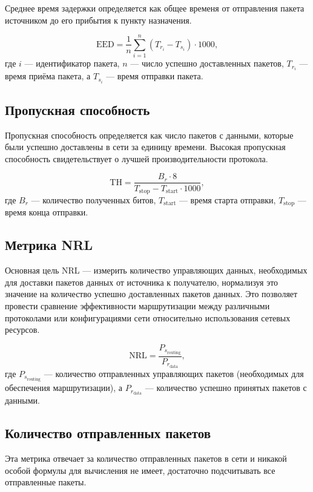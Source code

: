 Среднее время задержки определяется как общее временя от отправления пакета источником до его прибытия к пункту назначения.

\begin{equation}
  \label{eq:delay_calculation}
  \text{EED} = \frac{1}{n} \sum_{i=1}^{n}(T_{r_i} - T_{s_i}) \cdot 1000,
\end{equation}
где $i$ --- идентификатор пакета, $n$ --- число успешно доставленных пакетов, $T_{r_i}$ --- время приёма пакета, а $T_{s_i}$ --- время отправки пакета. 

\subsection{Пропускная способность}

Пропускная способность определяется как число пакетов с данными, которые были успешно доставлены в сети за единицу времени. Высокая пропускная способность свидетельствует о лучшей производительности протокола.

\begin{equation}
  \label{eq:throughput_calculation}
  \text{TH} = \frac{B_r \cdot 8}{T_{\text{stop}} - T_{\text{start}} \cdot 1000},
\end{equation}
где $B_r$ --- количество полученных битов, $T_{\text{start}}$ --- время старта отправки, $T_{\text{stop}}$ --- время конца отправки.

\subsection{Метрика NRL} 

Основная цель NRL --- измерить количество управляющих данных, необходимых для доставки пакетов данных от источника к получателю, нормализуя это значение на количество успешно доставленных пакетов данных. Это позволяет провести сравнение эффективности маршрутизации между различными протоколами или конфигурациями сети относительно использования сетевых ресурсов.

\begin{equation}
  \label{eq:nrl_calculation}
  \text{NRL} = \frac{P_{s_{\text{routing}}}}{P_{r_{\text{data}}}},
\end{equation}
где $P_{s_{\text{routing}}}$ --- количество отправленных управляющих пакетов (необходимых для обеспечения маршрутизации), а $P_{r_{\text{data}}}$ --- количество успешно принятых пакетов с данными.

\subsection{Количество отправленных пакетов}

Эта метрика отвечает за количество отправленных пакетов в сети и никакой особой формулы для вычисления не имеет, достаточно подсчитывать все отправленные пакеты.

